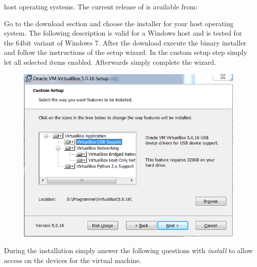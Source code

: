 host operating systems. The current release of \marktool{\virtualboxname} is available from:

\href{\virtualboxaddress}{\virtualboxaddress}

Go to the download section and choose the installer for your host operating system. The following description is valid for a Windows host and is tested for the 64bit variant of Windows 7. After the download execute the binary installer and follow the instructions of the setup wizard. In the custom setup step simply let all selected items enabled. Afterwards simply complete the wizard.

\begin{figure}[htbp]
\centering
\includegraphics[scale=\screenshotscalefac]{Figures/VirtualBox_Install_Custom_Setup}
\end{figure}

During the installation simply answer the following questions with \textit{install} to allow access on the devices for the virtual machine.

